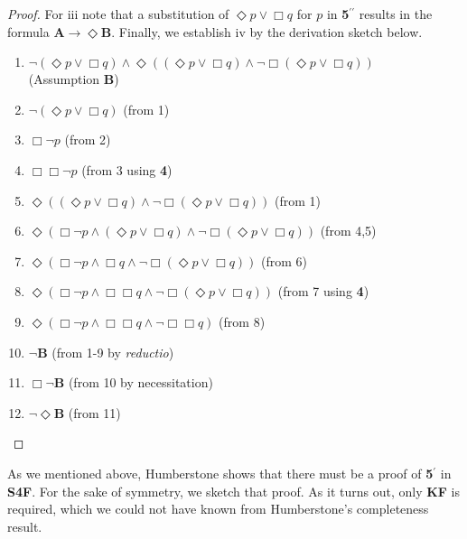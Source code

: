 \documentclass[11pt]{article}
\begin{document}
\begin{proof}
For iii note that a substitution of $\Diamond{p}\vee \Box q$ for $p$ in \textbf{5}$^{\prime\prime}$ results in the formula \textbf{A}$\rightarrow \Diamond\textbf{B}$.
Finally, we establish iv by the derivation sketch below.
\begin{enumerate}
\item{$ \neg (\Diamond{p}\vee \Box q) \wedge \Diamond((\Diamond{p}\vee \Box q) \wedge \neg \Box (\Diamond{p}\vee \Box q))$ \\ \tab\tab\tab\tab\tab (Assumption \textbf{B})}
\item{$\neg (\Diamond{p}\vee \Box q)$ \tab\tab\tab(from 1)}
\item{$ \Box \neg p$ \tab\tab\tab\tab(from 2)}
\item{$ \Box \Box \neg p$ \tab\tab\tab\tab(from 3 using \textbf{4})}
\item{$ \Diamond((\Diamond{p}\vee \Box q) \wedge \neg \Box (\Diamond{p}\vee \Box q))$ \tab(from 1)}
\item{$ \Diamond(\Box \neg p \wedge (\Diamond{p}\vee \Box q) \wedge \neg \Box (\Diamond{p}\vee \Box q))$ \tab(from 4,5)}
\item{$ \Diamond(\Box \neg p \wedge \Box q \wedge \neg \Box (\Diamond{p}\vee \Box q))$ \tab(from 6)}
\item{$ \Diamond(\Box \neg p \wedge \Box \Box q \wedge \neg \Box (\Diamond{p}\vee \Box q))$ \tab(from 7 using \textbf{4})}
\item{$\Diamond(\Box \neg p \wedge \Box \Box q \wedge \neg \Box \Box q)$ \tab\tab(from 8)}
\item{$ \neg $\textbf{B} \tab\tab\tab\tab(from 1-9 by \textit{reductio})}
\item{$ \Box \neg $\textbf{B} \tab\tab\tab\tab(from 10 by necessitation)}
\item{$ \neg \Diamond$\textbf{B} \tab\tab\tab\tab(from 11)}
\end{enumerate} 
\end{proof}

As we mentioned above, Humberstone shows that there must be a proof of \textbf{5}$^\prime$ in \textbf{S4F}. For the sake of symmetry, we sketch that proof. As it turns out, only \textbf{KF} is required, which we could not have known from Humberstone's completeness result.
\end{document}

